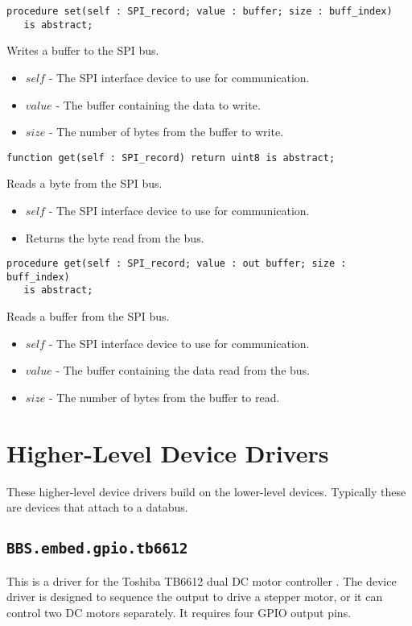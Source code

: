 \documentclass[10pt, openany]{book}
\newcommand{\indexfunc}[1]{\index[func]{#1}}
\newcommand{\package}[1]{\texttt{#1}}
\begin{document}
\begin{lstlisting}
procedure set(self : SPI_record; value : buffer; size : buff_index)
   is abstract;
\end{lstlisting}
\indexfunc{set}
Writes a buffer to the SPI bus.
\begin{itemize}
  \item $self$ - The SPI interface device to use for communication.
  \item $value$ - The buffer containing the data to write.
  \item $size$ - The number of bytes from the buffer to write.
\end{itemize}

\begin{lstlisting}
function get(self : SPI_record) return uint8 is abstract;
\end{lstlisting}
\indexfunc{get}
Reads a byte from the SPI bus.
\begin{itemize}
  \item $self$ - The SPI interface device to use for communication.
  \item Returns the byte read from the bus.
\end{itemize}

\begin{lstlisting}
procedure get(self : SPI_record; value : out buffer; size : buff_index)
   is abstract;
\end{lstlisting}
\indexfunc{set}
Reads a buffer from the SPI bus.
\begin{itemize}
  \item $self$ - The SPI interface device to use for communication.
  \item $value$ - The buffer containing the data read from the bus.
  \item $size$ - The number of bytes from the buffer to read.
\end{itemize}

\section{Higher-Level Device Drivers}
These higher-level device drivers build on the lower-level devices.  Typically these are devices that attach to a databus.

\subsection{\package{BBS.embed.gpio.tb6612}}
This is a driver for the Toshiba TB6612 dual DC motor controller \cite{TB6612}.  The device driver is designed to sequence the output to drive a stepper motor, or it can control two DC motors separately.  It requires four GPIO output pins.
\end{document}
